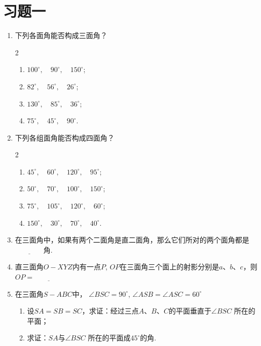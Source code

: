 \section*{习题一}
\begin{enumerate}
    \item 下列各面角能否构成三面角？
\begin{multicols}{2}
\begin{enumerate}[(1)]
    \item $100^{\circ},\quad 90^{\circ},\quad 150^{\circ}$;
    \item $82^{\circ},\quad 56^{\circ},\quad 26^{\circ}$;
    \item $130^{\circ},\quad 85^{\circ},\quad 36^{\circ}$;
    \item $75^{\circ},\quad 45^{\circ},\quad 90^{\circ}$.
\end{enumerate}

\end{multicols}
    \item 下列各组面角能否构成四面角？
\begin{multicols}{2}
\begin{enumerate}[(1)]
      \item $45^{\circ},\quad 60^{\circ},\quad 120^{\circ},\quad 95^{\circ}$;
    \item $50^{\circ},\quad 70^{\circ},\quad 100^{\circ},\quad 150^{\circ}$;
    \item $75^{\circ},\quad 105^{\circ},\quad 120^{\circ},\quad 60^{\circ}$;
    \item $150^{\circ},\quad 30^{\circ},\quad 70^{\circ},\quad 40^{\circ}$.
\end{enumerate}

\end{multicols}
    \item 在三面角中，如果有两个二面角是直二面角，那么它们所对的两个面角都是$\underline{\qquad\qquad}$角.

    \item 直三面角$O-XYZ$内有一点$P$, $OP$在三面角三个面上的射影分别是$a$、$b$、$c$，则 $OP=\underline{\qquad\qquad}$

    \item 在三面角$S-ABC$中， $\angle BSC=90^{\circ}$,  $\angle ASB=  \angle ASC=60^{\circ}$
\begin{enumerate}[(1)]
\item 设$SA=SB=SC$，求证：经过三点$A$、$B$、$C$的平面垂直于$\angle BSC$ 所在的平面；
\item 求证：$SA$与$\angle BSC$ 所在的平面成$45^{\circ}$的角.
\end{enumerate}
    

\end{enumerate}
